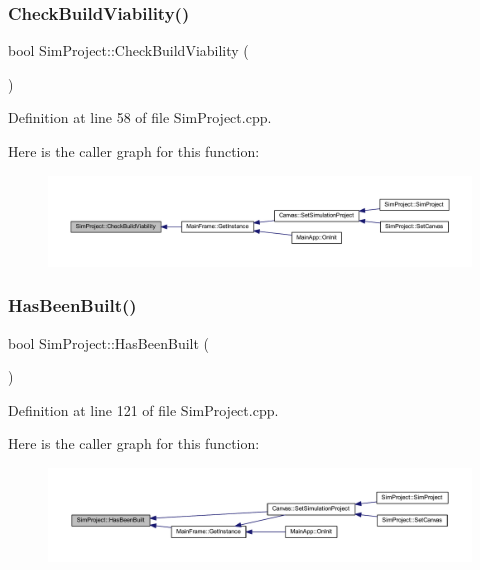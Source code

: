 \subsubsection{\texorpdfstring{Check\+Build\+Viability()}{CheckBuildViability()}}
{\footnotesize\ttfamily bool Sim\+Project\+::\+Check\+Build\+Viability (\begin{DoxyParamCaption}{ }\end{DoxyParamCaption})}



Definition at line 58 of file Sim\+Project.\+cpp.

Here is the caller graph for this function\+:
\nopagebreak
\begin{figure}[H]
\begin{center}
\leavevmode
\includegraphics[width=350pt]{class_sim_project_af638b9bd89328caf5c24f1189abe714b_icgraph}
\end{center}
\end{figure}
\mbox{\label{class_sim_project_a10cc29463f55112602d57f763cbea558}} 
\subsubsection{\texorpdfstring{Has\+Been\+Built()}{HasBeenBuilt()}}
{\footnotesize\ttfamily bool Sim\+Project\+::\+Has\+Been\+Built (\begin{DoxyParamCaption}{ }\end{DoxyParamCaption})}



Definition at line 121 of file Sim\+Project.\+cpp.

Here is the caller graph for this function\+:
\nopagebreak
\begin{figure}[H]
\begin{center}
\leavevmode
\includegraphics[width=350pt]{class_sim_project_a10cc29463f55112602d57f763cbea558_icgraph}
\end{center}
\end{figure}
\mbox{\label{class_sim_project_a37b86538831e7d1e814971c70dce1a54}} 
